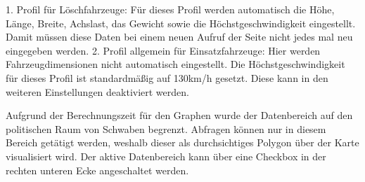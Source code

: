 \bigskip

1. Profil für Löschfahrzeuge: Für dieses Profil werden automatisch die Höhe, Länge, Breite, Achslast, das Gewicht sowie die Höchstgeschwindigkeit eingestellt.
Damit müssen diese Daten bei einem neuen Aufruf der Seite nicht jedes mal neu eingegeben werden.
2. Profil allgemein für Einsatzfahrzeuge: Hier werden Fahrzeugdimensionen nicht automatisch eingestellt.
Die Höchstgeschwindigkeit für dieses Profil ist standardmäßig auf 130km/h gesetzt.
Diese kann in den weiteren Einstellungen deaktiviert werden.

\bigskip

Aufgrund der Berechnungszeit für den Graphen wurde der Datenbereich auf den politischen Raum von Schwaben begrenzt.
Abfragen können nur in diesem Bereich getätigt werden, weshalb dieser als durchsichtiges Polygon über der Karte visualisiert wird.
Der aktive Datenbereich kann über eine Checkbox in der rechten unteren Ecke angeschaltet werden.
